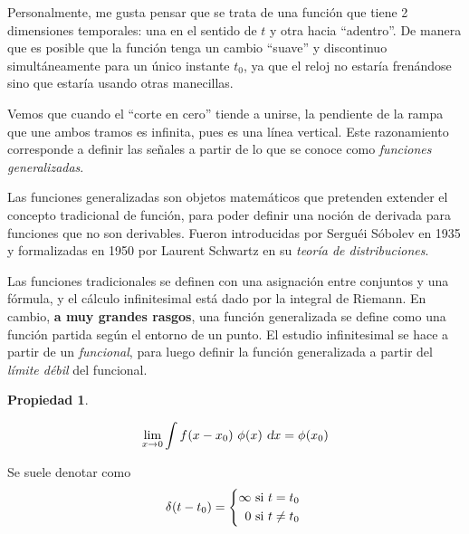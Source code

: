\documentclass[a5paper,12pt,twoside]{book}
\newtheorem{prop}{{Propiedad}}[chapter]
\begin{document}

Personalmente, me gusta pensar que se trata de una función que tiene 2 dimensiones temporales: una en el sentido de $t$ y otra hacia ``adentro''. De manera que es posible que la función tenga un cambio ``suave'' y discontinuo simultáneamente para un único instante $t_0$, ya que el reloj no estaría frenándose sino que estaría usando otras manecillas.

Vemos que cuando el ``corte en cero'' tiende a unirse, la pendiente de la rampa que une ambos tramos es infinita, pues es una línea vertical. Este razonamiento corresponde a definir las señales a partir de lo que se conoce como \emph{funciones generalizadas}.

Las funciones generalizadas son objetos matemáticos que pretenden extender el concepto tradicional de función, para poder definir una noción de derivada para funciones que no son derivables. Fueron introducidas por Serguéi Sóbolev en 1935 y formalizadas en 1950 por Laurent Schwartz en su \emph{teoría de distribuciones}.

Las funciones tradicionales se definen con una asignación entre conjuntos y una fórmula, y el cálculo infinitesimal está dado por la integral de Riemann. En cambio, \textbf{a muy grandes rasgos}, una función generalizada se define como una función partida según el entorno de un punto. El estudio infinitesimal se hace a partir de un \emph{funcional}, para luego definir la función generalizada a partir del \emph{límite débil} del funcional.

\begin{mdframed}[style=MyFrame1]
    \begin{prop}
        \label{prop:limDebil}
    \end{prop}
    \begin{equation*}
        \lim_{x \to 0} \int \fx{x-x_0} \, \fx[\phi]{x} \, \dif x = \fx[\phi]{x_0}
    \end{equation*}
\end{mdframed}



Se suele denotar como
\begin{equation*}
    \fx[\delta]{t-t_0} =
    \left\{
    \begin{aligned}
        \infty \text{ si $t=t_0$ }
        \\
        0 \text{ si $t \neq t_0$ }
    \end{aligned}
    \right.
\end{equation*}
\end{document}
